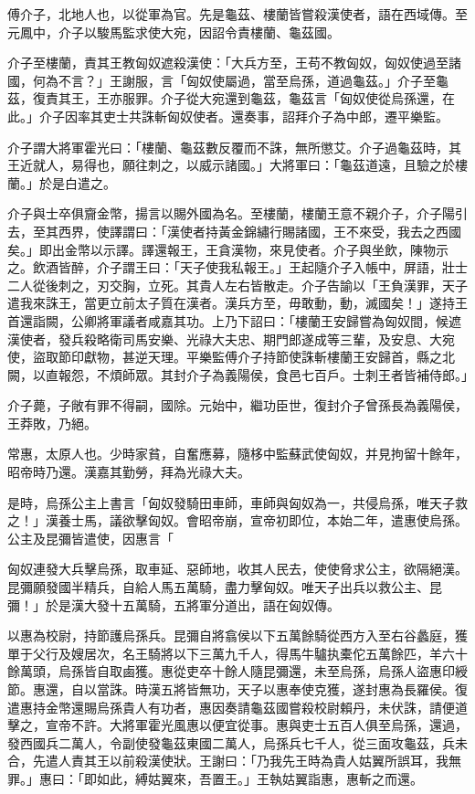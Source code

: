 
\begin{pinyinscope}
傅介子，北地人也，以從軍為官。先是龜茲、樓蘭皆嘗殺漢使者，語在西域傳。至元鳳中，介子以駿馬監求使大宛，因詔令責樓蘭、龜茲國。

介子至樓蘭，責其王教匈奴遮殺漢使：「大兵方至，王苟不教匈奴，匈奴使過至諸國，何為不言？」王謝服，言「匈奴使屬過，當至烏孫，道過龜茲。」介子至龜茲，復責其王，王亦服罪。介子從大宛還到龜茲，龜茲言「匈奴使從烏孫還，在此。」介子因率其吏士共誅斬匈奴使者。還奏事，詔拜介子為中郎，遷平樂監。

介子謂大將軍霍光曰：「樓蘭、龜茲數反覆而不誅，無所懲艾。介子過龜茲時，其王近就人，易得也，願往刺之，以威示諸國。」大將軍曰：「龜茲道遠，且驗之於樓蘭。」於是白遣之。

介子與士卒俱齎金幣，揚言以賜外國為名。至樓蘭，樓蘭王意不親介子，介子陽引去，至其西界，使譯謂曰：「漢使者持黃金錦繡行賜諸國，王不來受，我去之西國矣。」即出金幣以示譯。譯還報王，王貪漢物，來見使者。介子與坐飲，陳物示之。飲酒皆醉，介子謂王曰：「天子使我私報王。」王起隨介子入帳中，屏語，壯士二人從後刺之，刃交胸，立死。其貴人左右皆散走。介子告諭以「王負漢罪，天子遣我來誅王，當更立前太子質在漢者。漢兵方至，毋敢動，動，滅國矣！」遂持王首還詣闕，公卿將軍議者咸嘉其功。上乃下詔曰：「樓蘭王安歸嘗為匈奴間，候遮漢使者，發兵殺略衛司馬安樂、光祿大夫忠、期門郎遂成等三輩，及安息、大宛使，盜取節印獻物，甚逆天理。平樂監傅介子持節使誅斬樓蘭王安歸首，縣之北闕，以直報怨，不煩師眾。其封介子為義陽侯，食邑七百戶。士刺王者皆補侍郎。」

介子薨，子敞有罪不得嗣，國除。元始中，繼功臣世，復封介子曾孫長為義陽侯，王莽敗，乃絕。

常惠，太原人也。少時家貧，自奮應募，隨栘中監蘇武使匈奴，并見拘留十餘年，昭帝時乃還。漢嘉其勤勞，拜為光祿大夫。

是時，烏孫公主上書言「匈奴發騎田車師，車師與匈奴為一，共侵烏孫，唯天子救之！」漢養士馬，議欲擊匈奴。會昭帝崩，宣帝初即位，本始二年，遣惠使烏孫。公主及昆彌皆遣使，因惠言「

匈奴連發大兵擊烏孫，取車延、惡師地，收其人民去，使使脅求公主，欲隔絕漢。昆彌願發國半精兵，自給人馬五萬騎，盡力擊匈奴。唯天子出兵以救公主、昆彌！」於是漢大發十五萬騎，五將軍分道出，語在匈奴傳。

以惠為校尉，持節護烏孫兵。昆彌自將翕侯以下五萬餘騎從西方入至右谷蠡庭，獲單于父行及嫂居次，名王騎將以下三萬九千人，得馬牛驢执橐佗五萬餘匹，羊六十餘萬頭，烏孫皆自取鹵獲。惠從吏卒十餘人隨昆彌還，未至烏孫，烏孫人盜惠印綬節。惠還，自以當誅。時漢五將皆無功，天子以惠奉使克獲，遂封惠為長羅侯。復遣惠持金幣還賜烏孫貴人有功者，惠因奏請龜茲國嘗殺校尉賴丹，未伏誅，請便道擊之，宣帝不許。大將軍霍光風惠以便宜從事。惠與吏士五百人俱至烏孫，還過，發西國兵二萬人，令副使發龜茲東國二萬人，烏孫兵七千人，從三面攻龜茲，兵未合，先遣人責其王以前殺漢使狀。王謝曰：「乃我先王時為貴人姑翼所誤耳，我無罪。」惠曰：「即如此，縛姑翼來，吾置王。」王執姑翼詣惠，惠斬之而還。


\end{pinyinscope}
